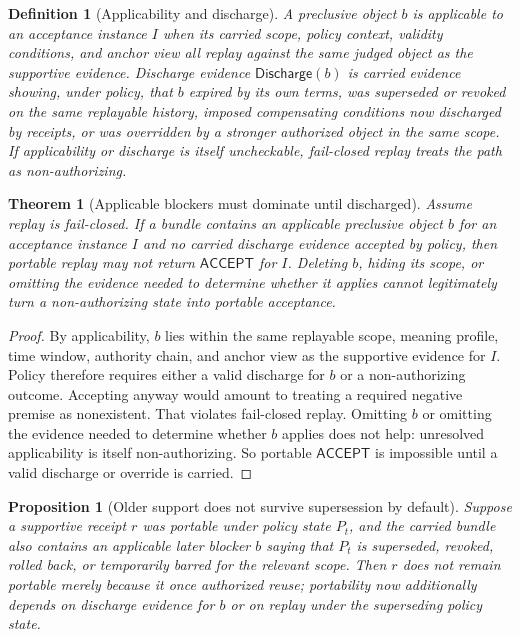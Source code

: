 \documentclass[11pt]{article}
\newtheorem{definition}{Definition}
\newtheorem{theorem}{Theorem}
\newtheorem{proposition}{Proposition}
\theoremstyle{remark}
\newcommand{\Acc}{\mathsf{ACCEPT}}
\newcommand{\Dis}{\mathsf{Discharge}}
\begin{document}
\begin{definition}[Applicability and discharge]
A preclusive object $b$ is \emph{applicable} to an acceptance instance $I$ when its carried scope, policy context, validity conditions, and anchor view all replay against the same judged object as the supportive evidence.
Discharge evidence $\Dis(b)$ is carried evidence showing, under policy, that $b$ expired by its own terms, was superseded or revoked on the same replayable history, imposed compensating conditions now discharged by receipts, or was overridden by a stronger authorized object in the same scope.
If applicability or discharge is itself uncheckable, fail-closed replay treats the path as non-authorizing.
\end{definition}

\begin{theorem}[Applicable blockers must dominate until discharged]
\label{thm:blockers-dominate}
Assume replay is fail-closed.
If a bundle contains an applicable preclusive object $b$ for an acceptance instance $I$ and no carried discharge evidence accepted by policy,
then portable replay may not return $\Acc$ for $I$.
Deleting $b$, hiding its scope, or omitting the evidence needed to determine whether it applies cannot legitimately turn a non-authorizing state into portable acceptance.
\end{theorem}

\begin{proof}
By applicability, $b$ lies within the same replayable scope, meaning profile, time window, authority chain, and anchor view as the supportive evidence for $I$.
Policy therefore requires either a valid discharge for $b$ or a non-authorizing outcome.
Accepting anyway would amount to treating a required negative premise as nonexistent.
That violates fail-closed replay.
Omitting $b$ or omitting the evidence needed to determine whether $b$ applies does not help: unresolved applicability is itself non-authorizing.
So portable $\Acc$ is impossible until a valid discharge or override is carried.
\end{proof}

\begin{proposition}[Older support does not survive supersession by default]
\label{prop:supersession-no-default-survival}
Suppose a supportive receipt $r$ was portable under policy state $P_t$, and the carried bundle also contains an applicable later blocker $b$ saying that $P_t$ is superseded, revoked, rolled back, or temporarily barred for the relevant scope.
Then $r$ does not remain portable merely because it once authorized reuse; portability now additionally depends on discharge evidence for $b$ or on replay under the superseding policy state.
\end{proposition}
\end{document}
